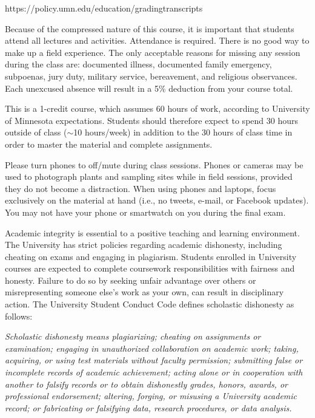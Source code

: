 \documentclass{tufte-handout}
\begin{document}
\begin{fullwidth}
https://policy.umn.edu/education/gradingtranscripts
					

												
 Because of the compressed nature of this course, it is important that students attend all lectures and activities. Attendance is required. There is no good way to make up a field experience. The only acceptable reasons for missing any session during the class are: documented illness, documented family emergency, subpoenas, jury duty, military service, bereavement, and religious observances. Each unexcused absence will result in a 5\% deduction from your course total.

 This is a 1-credit course, which assumes 60 hours of work, according to University of Minnesota expectations. Students should therefore expect to spend 30 hours outside of class ($\sim$10 hours/week) in addition to the 30 hours of class time in order to master the material and complete assignments.

 Please turn phones to off/mute during class sessions. Phones or cameras may be used to photograph plants and sampling sites while in field sessions, provided they do not become a distraction. When using phones and laptops, focus exclusively on the material at hand (i.e., no tweets, e-mail, or Facebook updates). You may not have your phone or smartwatch on you during the final exam.

 Academic integrity is essential to a positive teaching and learning environment. The University has strict policies regarding academic dishonesty, including cheating on exams and engaging in plagiarism. Students enrolled in University courses are expected to complete coursework responsibilities with fairness and honesty. Failure to do so by seeking unfair advantage over others or misrepresenting someone else’s work as your own, can result in disciplinary action. The University Student Conduct Code defines scholastic dishonesty as follows:

\emph{Scholastic dishonesty means plagiarizing; cheating on assignments or examination; engaging in unauthorized collaboration on academic work; taking, acquiring, or using test materials without faculty permission; submitting false or incomplete records of academic achievement; acting alone or in cooperation with another to falsify records or to obtain dishonestly grades, honors, awards, or professional endorsement; altering, forging, or misusing a University academic record; or fabricating or falsifying data, research procedures, or data analysis.}


\end{fullwidth}
\end{document}
